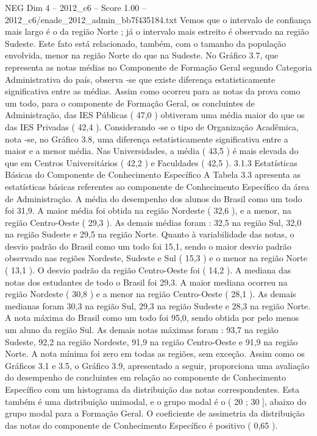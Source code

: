 \begin{textsample}{NEG Dim 4 – 2012\_c6 – Score 1.00 – 2012\_c6/enade\_2012\_admin\_bb7f435184.txt}
Vemos que o intervalo de confiança mais largo é o da região Norte ; já o intervalo mais estreito é observado na região Sudeste.
Este fato está relacionado, também, com o tamanho da população envolvida, menor na região Norte do que na Sudeste.
No Gráfico 3.7, que representa as notas médias no Componente de Formação Geral segundo Categoria Administrativa do país, observa -se que existe diferença estatisticamente significativa entre as médias.
Assim como ocorreu para as notas da prova como um todo, para o componente de Formação Geral, os concluintes de Administração, das IES Públicas ( 47,0 ) obtiveram uma média maior do que os das IES Privadas ( 42,4 ).
Considerando -se o tipo de Organização Acadêmica, nota -se, no Gráfico 3.8, uma diferença estatisticamente significativa entre a maior e a menor média.
Nas Universidades, a média ( 43,5 ) é mais elevada do que em Centros Universitários ( 42,2 ) e Faculdades ( 42,5 ). 3.1.3 Estatísticas Básicas do Componente de Conhecimento Específico A Tabela 3.3 apresenta as estatísticas básicas referentes ao componente de Conhecimento Específico da área de Administração.
A média do desempenho dos alunos do Brasil como um todo foi 31,9.
A maior média foi obtida na região Nordeste ( 32,6 ), e a menor, na região Centro-Oeste ( 29,3 ).
As demais médias foram : 32,5 na região Sul, 32,0 na região Sudeste e 29,5 na região Norte.
Quanto à variabilidade das notas, o desvio padrão do Brasil como um todo foi 15,1, sendo o maior desvio padrão observado nas regiões Nordeste, Sudeste e Sul ( 15,3 ) e o menor na região Norte ( 13,1 ).
O desvio padrão da região Centro-Oeste foi ( 14,2 ).
A mediana das notas dos estudantes de todo o Brasil foi 29,3.
A maior mediana ocorreu na região Nordeste ( 30,8 ) e a menor na região Centro-Oeste ( 28,1 ).
As demais medianas foram 30,3 na região Sul, 29,3 na região Sudeste e 28,3 na região Norte.
A nota máxima do Brasil como um todo foi 95,0, sendo obtida por pelo menos um aluno da região Sul.
As demais notas máximas foram : 93,7 na região Sudeste, 92,2 na região Nordeste, 91,9 na região Centro-Oeste e 91,9 na região Norte.
A nota mínima foi zero em todas as regiões, sem exceção.
Assim como os Gráficos 3.1 e 3.5, o Gráfico 3.9, apresentado a seguir, proporciona uma avaliação do desempenho de concluintes em relação ao componente de Conhecimento Específico com um histograma da distribuição das notas correspondentes.
Esta também é uma distribuição unimodal, e o grupo modal é o ( 20 ; 30 ], abaixo do grupo modal para a Formação Geral.
O coeficiente de assimetria da distribuição das notas do componente de Conhecimento Específico é positivo ( 0,65 ).

\end{textsample}
